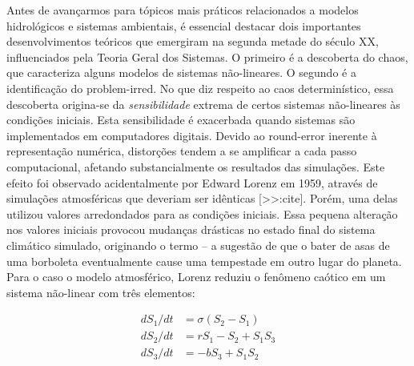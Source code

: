 \documentclass[./main.tex]{subfiles}
\begin{document}
\par Antes de avançarmos para tópicos mais práticos relacionados a modelos hidrológicos e sistemas ambientais, é essencial destacar dois importantes desenvolvimentos teóricos que emergiram na segunda metade do século XX, influenciados pela Teoria Geral dos Sistemas. O primeiro é a descoberta do \gls{chaos}, que caracteriza alguns modelos de sistemas não-lineares. O segundo é a identificação do \gls{problem-irred}. No que diz respeito ao caos determinístico, essa descoberta origina-se da \textit{sensibilidade} extrema de certos sistemas não-lineares às condições iniciais. Esta sensibilidade é exacerbada quando sistemas são implementados em computadores digitais. Devido ao \gls{round-error} inerente à representação numérica, distorções tendem a se amplificar a cada passo computacional, afetando substancialmente os resultados das simulações. Este efeito foi observado acidentalmente por Edward Lorenz em 1959, através de simulações atmosféricas que deveriam ser idênticas [>>:cite]. Porém, uma delas utilizou valores arredondados para as condições iniciais. Essa pequena alteração nos valores iniciais provocou mudanças drásticas no estado final do sistema climático simulado, originando o termo  – a sugestão de que o bater de asas de uma borboleta eventualmente cause uma tempestade em outro lugar do planeta. Para o caso o modelo atmosférico, Lorenz reduziu o fenômeno caótico em um sistema não-linear com três elementos:
\begin{linenomath*}
\[
\begin{split}
    dS_1/dt &= \sigma (S_2 - S_1)\\
    dS_2/dt &= rS_1 - S_2 + S_1S_3\\
    dS_3/dt &= -bS_3 + S_1S_2\\
\end{split}
\]
\end{linenomath*}
\end{document}
